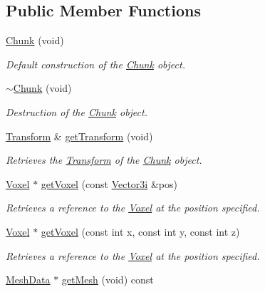 \subsection*{Public Member Functions}
\begin{DoxyCompactItemize}
\item 
\hyperlink{classsparky_1_1_chunk_aa97fa2698af88d0016dd530fb15b7058}{Chunk} (void)
\begin{DoxyCompactList}\small\item\em Default construction of the \hyperlink{classsparky_1_1_chunk}{Chunk} object. \end{DoxyCompactList}\item 
\hyperlink{classsparky_1_1_chunk_abffb3a373d72632f02bed7be42cd2cd7}{$\sim$\+Chunk} (void)
\begin{DoxyCompactList}\small\item\em Destruction of the \hyperlink{classsparky_1_1_chunk}{Chunk} object. \end{DoxyCompactList}\item 
\hyperlink{classsparky_1_1_transform}{Transform} \& \hyperlink{classsparky_1_1_chunk_afff0bec815828d5fba3523ef85c1083f}{get\+Transform} (void)
\begin{DoxyCompactList}\small\item\em Retrieves the \hyperlink{classsparky_1_1_transform}{Transform} of the \hyperlink{classsparky_1_1_chunk}{Chunk} object. \end{DoxyCompactList}\item 
\hyperlink{classsparky_1_1_voxel}{Voxel} $\ast$ \hyperlink{classsparky_1_1_chunk_adc8906c4ddc933c7e27fc273f6ec6e4d}{get\+Voxel} (const \hyperlink{classsparky_1_1_vector3}{Vector3i} \&pos)
\begin{DoxyCompactList}\small\item\em Retrieves a reference to the \hyperlink{classsparky_1_1_voxel}{Voxel} at the position specified. \end{DoxyCompactList}\item 
\hyperlink{classsparky_1_1_voxel}{Voxel} $\ast$ \hyperlink{classsparky_1_1_chunk_a7afbe6ac2eb709d5cc59c0c9e3540b5b}{get\+Voxel} (const int x, const int y, const int z)
\begin{DoxyCompactList}\small\item\em Retrieves a reference to the \hyperlink{classsparky_1_1_voxel}{Voxel} at the position specified. \end{DoxyCompactList}\item 
\hyperlink{classsparky_1_1_mesh_data}{Mesh\+Data} $\ast$ \hyperlink{classsparky_1_1_chunk_aec95749745f482ae6aca2a813cd1b420}{get\+Mesh} (void) const 

\end{DoxyCompactItemize}
